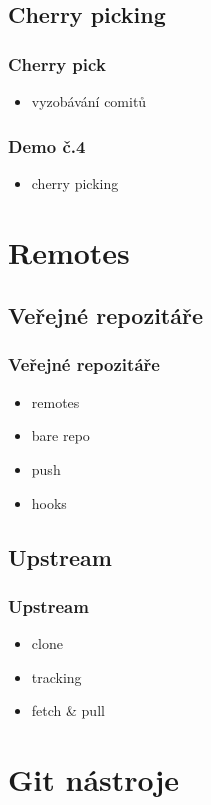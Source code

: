 \documentclass[pdftex]{beamer}
\begin{document}
\subsection{Cherry picking}

\begin{frame}
	\frametitle{Cherry pick}
	\begin{itemize}
		\item vyzobávání comitů
	\end{itemize}
\end{frame}

\begin{frame}
	\frametitle{Demo č.4}
	\begin{itemize}
		\item cherry picking
	\end{itemize}
\end{frame}

\section{Remotes}
\subsection{Veřejné repozitáře}

\begin{frame}
	\frametitle{Veřejné repozitáře}
	\begin{itemize}
		\item remotes
		\item bare repo
		\item push
		\item hooks
	\end{itemize}
\end{frame}

\subsection{Upstream}

\begin{frame}
	\frametitle{Upstream}
	\begin{itemize}
		\item clone
		\item tracking
		\item fetch \& pull
	\end{itemize}
\end{frame}

\section{Git nástroje}
\end{document}
